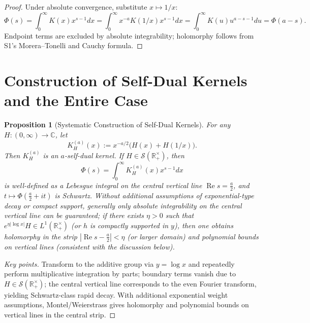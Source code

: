 \documentclass[11pt,a4paper]{article}
\newtheorem{proposition}[theorem]{Proposition}
\theoremstyle{remark}
\DeclareMathOperator{\Re}{Re}
\begin{document}
\begin{proof}
Under absolute convergence, substitute $x\mapsto 1/x$:
\begin{equation}
\Phi(s)=\int_0^\infty K(x) x^{s-1} dx
=\int_0^\infty x^{-a} K(1/x) x^{s-1} dx
=\int_0^\infty K(u) u^{a-s-1} du
=\Phi(a-s).
\end{equation}
Endpoint terms are excluded by absolute integrability; holomorphy follows from S1's Morera--Tonelli and Cauchy formula.
\end{proof}

\section{Construction of Self-Dual Kernels and the Entire Case}

\begin{proposition}[Systematic Construction of Self-Dual Kernels]\label{prop:construction}
For any $H:(0,\infty)\to\mathbb{C}$, let
\begin{equation}
K_H^{(a)}(x):=x^{-a/2}\big(H(x)+H(1/x)\big).
\end{equation}
Then $K_H^{(a)}$ is an $a$-self-dual kernel. If $H\in\mathcal{S}(\mathbb{R}_+^\times)$, then
\begin{equation}
\Phi(s)=\int_0^\infty K_H^{(a)}(x) x^{s-1} dx
\end{equation}
is well-defined as a Lebesgue integral on the central vertical line $\Re s=\frac{a}{2}$, and $t\mapsto \Phi(\frac{a}{2}+it)$ is Schwartz. Without additional assumptions of exponential-type decay or compact support, generally only absolute integrability on the central vertical line can be guaranteed; if there exists $\eta>0$ such that $e^{\eta|\log x|}H\in L^1(\mathbb{R}_+^\times)$ (or $h$ is compactly supported in $y$), then one obtains holomorphy in the strip $|\Re s-\frac{a}{2}|<\eta$ (or larger domain) and polynomial bounds on vertical lines (consistent with the discussion below).
\end{proposition}

\begin{proof}[Key points]
Transform to the additive group via $y=\log x$ and repeatedly perform multiplicative integration by parts; boundary terms vanish due to $H\in\mathcal{S}(\mathbb{R}_+^\times)$; the central vertical line corresponds to the even Fourier transform, yielding Schwartz-class rapid decay. With additional exponential weight assumptions, Montel/Weierstrass gives holomorphy and polynomial bounds on vertical lines in the central strip.
\end{proof}
\end{document}
